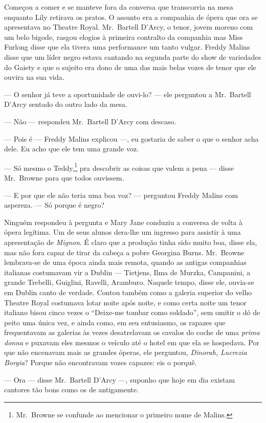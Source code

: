 Começou a comer e se manteve fora da conversa que transcorria na mesa enquanto
Lily retirava os pratos.  O assunto era a companhia de ópera que ora se
apresentava no Theatre Royal.  Mr.~Bartell D’Arcy, o tenor, jovem moreno com um
belo bigode, rasgou elogios à primeira contralto da companhia mas Miss Furlong
disse que ela tivera uma performance um tanto vulgar.  Freddy Malins disse que
um líder negro estava cantando na segunda parte do show de variedades do Gaiety
e que o sujeito era dono de uma das mais belas vozes de tenor que ele ouvira na
sua vida.

--- O senhor já teve a oportunidade de ouvi-lo? --- ele perguntou a 
Mr.~Bartell D’Arcy sentado do outro lado da mesa.

--- Não --- respondeu Mr.~Bartell D’Arcy com descaso.

--- Pois é --- Freddy Malins explicou ---, eu gostaria de saber o que o senhor
acha dele.  Eu acho que ele tem uma grande voz.

--- Só mesmo o Teddy,\footnote{ Mr.~Browne se confunde ao mencionar o primeiro
nome de Malins.} pra descobrir as coisas que valem a pena --- disse
Mr.~Browne para que todos ouvissem.

--- E por que ele não teria uma boa voz? --- perguntou Freddy Malins com
aspereza.  --- Só porque é negro?

Ninguém respondeu à pergunta e Mary Jane conduziu a conversa de volta à ópera
legítima.  Um de seus alunos dera-lhe um ingresso para assistir à uma
apresentação de \textit{Mignon}.  É claro que a produção tinha sido muito boa,
disse ela, mas não fora capaz de tirar da cabeça a pobre Georgina Burns.  
Mr.~Browne lembrava-se de uma época ainda mais remota, quando as antigas companhias
italianas costumavam vir a Dublin --- Tietjens, Ilma de Murzka, Campanini, a
grande Trebelli, Guiglini, Ravelli, Aramburo.  Naquele tempo, disse ele,
ouvia-se em Dublin canto de verdade.  Contou também como a galeria superior do
velho Theatre Royal costumava lotar noite após noite, e como certa noite um
tenor italiano bisou cinco vezes o “Deixe-me tombar como soldado”, sem omitir o
dó de peito uma única vez, e ainda como, em seu entusiasmo, os rapazes que
frequentavam as galerias às vezes desatrelavam os cavalos do coche de uma
\textit{prima donna} e puxavam eles mesmos o veículo até o hotel em que ela se
hospedava.  Por que não encenavam mais as grandes óperas, ele perguntou,
\textit{Dinorah, Lucrezia Borgia}?  Porque não encontravam vozes capazes: eis o
porquê.

--- Ora --- disse Mr.~Bartell D’Arcy ---, suponho que hoje em dia existam
cantores tão bons como os de antigamente.

